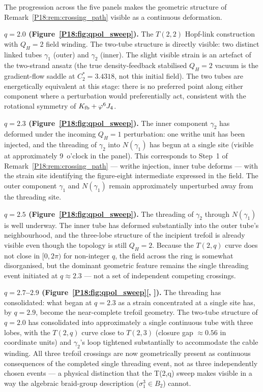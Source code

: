 \documentclass[11pt,a4paper]{article}
\theoremstyle{definition}\newtheorem{definition}[theorem]{Definition}
\theoremstyle{remark}
\newcommand{\vp}{\varphi}
\newcommand{\QH}{Q_H}
\begin{document}
The progression across the five panels makes the geometric structure
of Remark~\ref{P18:rem:crossing_path} visible as a continuous
deformation.

\textbf{$q=2.0$ (Figure~\ref{P18:fig:qpol_sweep}).}  The $T(2,2)$
Hopf-link construction with $\QH=2$ field winding.  The two-tube
structure is directly visible: two distinct linked tubes
$\gamma_1$ (outer) and $\gamma_2$ (inner).  The slight visible
strain is an artefact of the two-strand ansatz (the true
density-feedback stabilised $\QH=2$ vacuum is the gradient-flow
saddle at $C_2^*=3.4318$, not this initial field).  The two tubes
are energetically equivalent at this stage: there is no preferred
point along either component where a perturbation would
preferentially act, consistent with the rotational symmetry of
$K_{\rm fb}+\vp^6 J_4$.

\textbf{$q=2.3$ (Figure~\ref{P18:fig:qpol_sweep}).}  The inner component
$\gamma_2$ has deformed under the incoming $\QH=1$ perturbation: one
writhe unit has been injected, and the threading of $\gamma_2$ into
$N(\gamma_1)$ has begun at a single site (visible at approximately
9~o'clock in the panel).  This corresponds to Step~1 of
Remark~\ref{P18:rem:crossing_path} --- writhe injection, inner tube
deforms --- with the strain site identifying the figure-eight
intermediate expressed in the field.  The outer component $\gamma_1$
and $N(\gamma_1)$ remain approximately unperturbed away from the
threading site.

\textbf{$q=2.5$ (Figure~\ref{P18:fig:qpol_sweep}).}  The threading of
$\gamma_2$ through $N(\gamma_1)$ is well underway.  The inner tube
has deformed substantially into the outer tube's neighbourhood, and
the three-lobe structure of the incipient trefoil is already visible
even though the topology is still $\QH=2$.  Because the $T(2,q)$
curve does not close in $[0,2\pi)$ for non-integer $q$, the field
across the ring is somewhat disorganised, but the dominant geometric
feature remains the single threading event initiated at $q\approx2.3$
--- not a set of independent competing crossings.

\textbf{$q=2.7$--$2.9$ (Figure~\ref{P18:fig:qpol_sweep}[,
]).}  The threading
has consolidated: what began at $q=2.3$ as a strain concentrated at a
single site has, by $q=2.9$, become the near-complete trefoil
geometry.  The two-tube structure of $q=2.0$ has consolidated into
approximately a single continuous tube with three lobes, with the
$T(2,q)$ curve close to $T(2,3)$ (closure gap $\approx0.56$ in
coordinate units) and $\gamma_2$'s loop tightened substantially to
accommodate the cable winding.  All three trefoil crossings are now
geometrically present as continuous consequences of the completed
single threading event, not as three independently chosen events
--- a physical distinction that the T(2,q) sweep makes visible in a
way the algebraic braid-group description
($\sigma_1^3\in B_2$) cannot.
\end{document}
